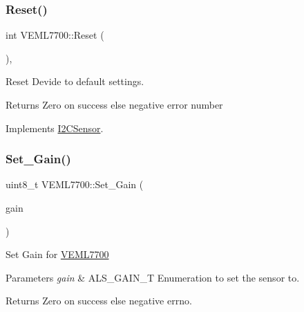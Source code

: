 \mbox{\label{classVEML7700_a381358f8998260f4600a0d6713f7ea2a}} 
\subsubsection{\texorpdfstring{Reset()}{Reset()}}
{\footnotesize\ttfamily int V\+E\+M\+L7700\+::\+Reset (\begin{DoxyParamCaption}\item[{void}]{ }\end{DoxyParamCaption})\hspace{0.3cm}{\ttfamily [override]}, {\ttfamily [virtual]}}

Reset Devide to default settings.

\begin{DoxyReturn}{Returns}
Zero on success else negative error number 
\end{DoxyReturn}


Implements \hyperlink{classI2CSensor_a0622266d335944782d2bfa6352f01095}{I2\+C\+Sensor}.

\mbox{\label{classVEML7700_aecbcabefbc9469ea91153723925acbd3}} 
\subsubsection{\texorpdfstring{Set\+\_\+\+Gain()}{Set\_Gain()}}
{\footnotesize\ttfamily uint8\+\_\+t V\+E\+M\+L7700\+::\+Set\+\_\+\+Gain (\begin{DoxyParamCaption}\item[{\hyperlink{classVEML7700_a7328cc2563da545e48ea72381dc7bd9b}{A\+L\+S\+\_\+\+G\+A\+I\+N\+\_\+T}}]{gain }\end{DoxyParamCaption})}

Set Gain for \hyperlink{classVEML7700}{V\+E\+M\+L7700}


\begin{DoxyParams}{Parameters}
{\em gain} & A\+L\+S\+\_\+\+G\+A\+I\+N\+\_\+T Enumeration to set the sensor to.\\
\hline
\end{DoxyParams}
\begin{DoxyReturn}{Returns}
Zero on success else negative errno. 
\end{DoxyReturn}
\mbox{\label{classVEML7700_af3f3de94154ca1dd8905e932686ca23c}} 
